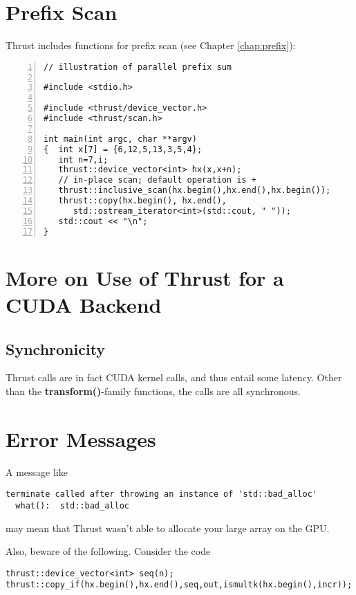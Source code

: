 \section{Prefix Scan}

Thrust includes functions for prefix scan (see Chapter
\ref{chap:prefix}):

\begin{lstlisting}[numbers=left]
// illustration of parallel prefix sum

#include <stdio.h>

#include <thrust/device_vector.h>
#include <thrust/scan.h>

int main(int argc, char **argv)
{  int x[7] = {6,12,5,13,3,5,4};
   int n=7,i;
   thrust::device_vector<int> hx(x,x+n);
   // in-place scan; default operation is +
   thrust::inclusive_scan(hx.begin(),hx.end(),hx.begin());
   thrust::copy(hx.begin(), hx.end(), 
      std::ostream_iterator<int>(std::cout, " "));
   std::cout << "\n";
}
\end{lstlisting}

\section{More on Use of Thrust for a CUDA Backend}

\subsection{Synchronicity}

Thrust calls are in fact CUDA kernel calls, and thus entail some
latency.  Other than the {\bf transform()}-family functions, the calls
are all synchronous.

\section{Error Messages}

A message like

\begin{lstlisting}
terminate called after throwing an instance of 'std::bad_alloc'
  what():  std::bad_alloc
\end{lstlisting}

may mean that Thrust wasn't able to allocate your large array on the
GPU.

Also, beware of the following.  Consider the code

\begin{lstlisting}
thrust::device_vector<int> seq(n);
thrust::copy_if(hx.begin(),hx.end(),seq,out,ismultk(hx.begin(),incr));
\end{lstlisting}

